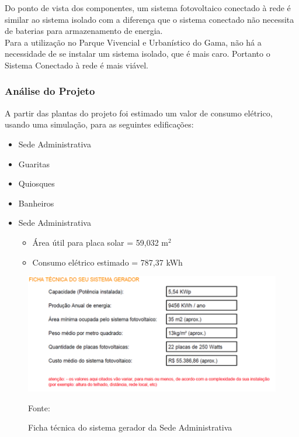 Do ponto de vista dos componentes, um sistema fotovoltaico conectado \`a rede \'e similar ao sistema isolado com a diferen\c{c}a que o sistema conectado n\~ao necessita de baterias para armazenamento de energia.\\ 

Para a utiliza\c{c}\~ao no Parque Vivencial e Urban\'istico do Gama, n\~ao h\'a a necessidade de se instalar um sistema isolado, que \'e mais caro. Portanto o Sistema Conectado \`a rede \'e mais vi\'avel.

\subsubsection{An\'alise do Projeto}

A partir das plantas do projeto foi estimado um valor de consumo el\'etrico, usando uma simula\c{c}\~ao, para as seguintes edifica\c{c}\~oes:

 \begin{itemize}
        \item Sede Administrativa
	\item Guaritas
	\item Quiosques
	\item Banheiros
\end{itemize}

\begin{itemize}
      \item Sede Administrativa
             \begin{itemize}
                       \item \'Area \'util para placa solar	=	59,032 m$^{2}$ 
                       \item Consumo el\'etrico estimado	=	787,37 kWh 
	     \end{itemize}
\end{itemize}

\begin{figure}[h!]
	 \centering
	 \label{SistemaGeradorSede}
	\includegraphics[keepaspectratio=true,scale=0.8]{figuras/SistemaGeradorSede.png}
	\caption{Ficha t\'ecnica do sistema gerador da Sede Administrativa}
	\small{Fonte: \protected\cite{PortalSolar}}
\end{figure}

